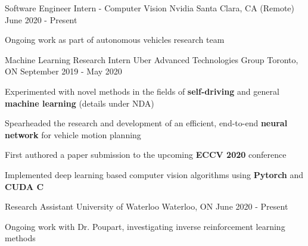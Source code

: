 
\begin{cventries}
  \cventry
    {Software Engineer Intern - Computer Vision} %
    {Nvidia} %
    {Santa Clara, CA (Remote)} %
    {June 2020 - Present} %
    {
      \begin{cvitems} %
        \item {Ongoing work as part of autonomous vehicles research team}
      \end{cvitems}
    }

  \cventry
    {Machine Learning Research Intern} %
    {Uber Advanced Technologies Group} %
    {Toronto, ON} %
    {September 2019 - May 2020} %
    {
      \begin{cvitems} %
        \item {Experimented with novel methods in the fields of \textbf{self-driving} and general \textbf{machine learning} (details under NDA)}
        \item {Spearheaded the research and development of an efficient, end-to-end \textbf{neural network} for vehicle motion planning}
        \item {First authored a paper submission to the upcoming \textbf{ECCV 2020} conference}
        \item {Implemented deep learning based computer vision algorithms using \textbf{Pytorch} and \textbf{CUDA C}}
      \end{cvitems}
    }

  \cventry
    {Research Assistant} %
    {University of Waterloo} %
    {Waterloo, ON} %
    {June 2020 - Present} %
    {
      \begin{cvitems} %
        \item {Ongoing work with Dr. Poupart, investigating inverse reinforcement learning methods}
      \end{cvitems}
    }


\end{cventries}
